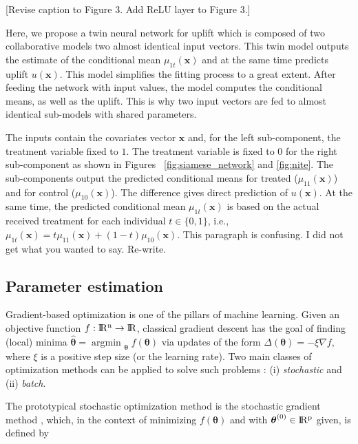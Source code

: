 \documentclass{article}
\def\x{\mathbf x}
\def \real{\rm I\!R}
\def \vahid {\color{magenta}}
\DeclareMathOperator*{\argmin}{argmin~} %
\begin{document}

{\vahid [Revise caption to Figure 3. Add ReLU layer to  Figure 3.]}

Here, we propose a twin neural network for uplift which is composed of two collaborative models two almost identical input vectors. This twin model outputs the estimate of the conditional mean $\mu_{1t}(\x)$ and at the same time predicts uplift $u(\x)$. This model simplifies the fitting process to a great extent. After feeding the network with input values, the model computes the conditional means, as well as the uplift. This is why two input vectors are fed to almost identical sub-models with shared parameters. 



The inputs contain the covariates vector $\x$ and, for the left sub-component, the treatment variable fixed to $1$. The treatment variable is fixed to $0$ for the right sub-component as shown in Figures~ \ref{fig:siamese_network} and \ref{fig:nite}. The sub-components output the predicted conditional means for treated ($\mu_{11}(\x)$) and for control ($\mu_{10}(\x)$). The difference gives direct prediction of $u(\x)$. At the same time, the predicted conditional mean $\mu_{1t}(\x)$ is based on the actual received treatment for each individual $t \in \{0,1\}$, i.e., $\mu_{1t}(\x) = t \mu_{11}(\x) + (1-t) \mu_{10}(\x)$. 
{\vahid This paragraph is confusing. I did not get what you wanted to say. Re-write.}

\subsection{Parameter estimation}
\label{sec:smite_to_sgd}

Gradient-based optimization is one of the pillars of machine learning. Given an objective function $f: \real^n \rightarrow \real$, classical gradient descent has the goal of finding
(local) minima $\hat{\boldsymbol{\theta}} = \argmin_{\boldsymbol{\theta}} f(\boldsymbol{\theta})$ via updates of the form $ \Delta (\boldsymbol{\theta}) =  -\xi \nabla f$, where $\xi$
is a positive step size (or the learning rate). Two main classes of optimization methods can be applied to solve such problems : (i) {\it stochastic} and (ii) {\it batch}.

The prototypical stochastic optimization method is the stochastic gradient
method \citep{robbins1951stochastic}, which, in the context of minimizing $f(\boldsymbol{\theta})$ and with $\boldsymbol{\theta}^{(0)} \in \real^p$ given, is defined by
\end{document}
